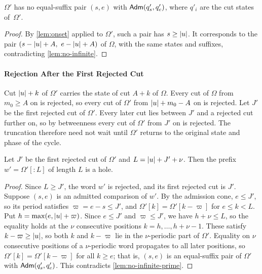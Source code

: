 \begin{lemma}\label{lem:no-infinite-prime}
$\Omega'$ has no equal-suffix pair $(s,e)$ with $\mathsf{Adm}(q'_s,q'_e)$, where $q'_i$ are the cut
states of~$\Omega'$.
\end{lemma}

\begin{proof}
By \cref{lem:onset} applied to $\Omega'$, such a pair has $s \ge \lvert u\rvert$. It corresponds to the
pair $(s - \lvert u\rvert + A,\ e - \lvert u\rvert + A)$ of $\Omega$, with the same states and suffixes,
contradicting \cref{lem:no-infinite}.
\end{proof}

\paragraph{Rejection After the First Rejected Cut}
Cut $\lvert u\rvert+k$ of $\Omega'$ carries the state of cut $A+k$ of $\Omega$. Every cut of $\Omega$
from $m_0 \ge A$ on is rejected, so every cut of $\Omega'$ from $\lvert u\rvert + m_0 - A$ on is
rejected. Let $J'$ be the first rejected cut of $\Omega'$. Every later cut lies between $J'$
and a rejected cut further on, so by betweenness every cut of $\Omega'$ from $J'$ on is
rejected. The truncation therefore need not wait until $\Omega'$ returns to the original
state and phase of the cycle.

\begin{lemma}\label{lem:truncation}
Let $J'$ be the first rejected cut of $\Omega'$ and $L = \lvert u\rvert + J' + \nu$. Then the prefix
$w' = \Omega'[{:}L]$ of length $L$ is a hole.
\end{lemma}

\begin{proof}
Since $L \ge J'$, the word $w'$ is rejected, and its first rejected cut is $J'$. Suppose
$(s,e)$ is an admitted comparison of $w'$. By the admission cone, $e \le J'$, so its period
satisfies $\varpi = e - s \le J'$, and $\Omega'[k] = \Omega'[k-\varpi]$ for $e \le k < L$. Put
$h = \max(e, \lvert u\rvert+\varpi)$. Since $e \le J'$ and $\varpi \le J'$, we have $h + \nu \le L$, so the
equality holds at the $\nu$ consecutive positions $k = h, \dots, h+\nu-1$. These satisfy
$k - \varpi \ge \lvert u\rvert$, so both $k$ and $k-\varpi$ lie in the $\nu$-periodic part of $\Omega'$.
Equality on $\nu$ consecutive positions of a $\nu$-periodic word propagates to all later
positions, so $\Omega'[k] = \Omega'[k-\varpi]$ for all $k \ge e$; that is, $(s,e)$ is an
equal-suffix pair of $\Omega'$ with $\mathsf{Adm}(q'_s,q'_e)$. This contradicts
\cref{lem:no-infinite-prime}.
\end{proof}

